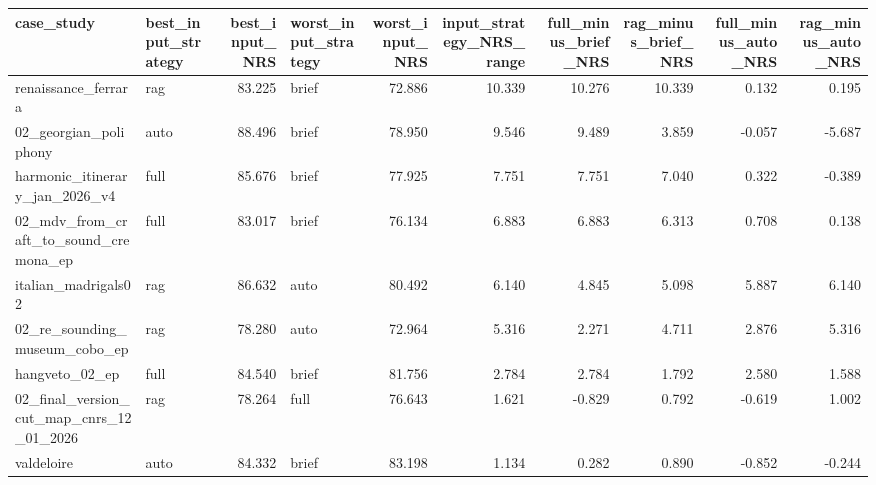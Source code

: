 \documentclass{article}
\begin{document}
\begin{tabular}{llrlrrrrrr}
\toprule
case\_study & best\_input\_strategy & best\_input\_NRS & worst\_input\_strategy & worst\_input\_NRS & input\_strategy\_NRS\_range & full\_minus\_brief\_NRS & rag\_minus\_brief\_NRS & full\_minus\_auto\_NRS & rag\_minus\_auto\_NRS \\
\midrule
renaissance\_ferrara & rag & 83.225 & brief & 72.886 & 10.339 & 10.276 & 10.339 & 0.132 & 0.195 \\
02\_georgian\_poliphony & auto & 88.496 & brief & 78.950 & 9.546 & 9.489 & 3.859 & -0.057 & -5.687 \\
harmonic\_itinerary\_jan\_2026\_v4 & full & 85.676 & brief & 77.925 & 7.751 & 7.751 & 7.040 & 0.322 & -0.389 \\
02\_mdv\_from\_craft\_to\_sound\_cremona\_ep & full & 83.017 & brief & 76.134 & 6.883 & 6.883 & 6.313 & 0.708 & 0.138 \\
italian\_madrigals02 & rag & 86.632 & auto & 80.492 & 6.140 & 4.845 & 5.098 & 5.887 & 6.140 \\
02\_re\_sounding\_museum\_cobo\_ep & rag & 78.280 & auto & 72.964 & 5.316 & 2.271 & 4.711 & 2.876 & 5.316 \\
hangveto\_02\_ep & full & 84.540 & brief & 81.756 & 2.784 & 2.784 & 1.792 & 2.580 & 1.588 \\
02\_final\_version\_cut\_map\_cnrs\_12\_01\_2026 & rag & 78.264 & full & 76.643 & 1.621 & -0.829 & 0.792 & -0.619 & 1.002 \\
valdeloire & auto & 84.332 & brief & 83.198 & 1.134 & 0.282 & 0.890 & -0.852 & -0.244 \\
\bottomrule
\end{tabular}
\end{document}
